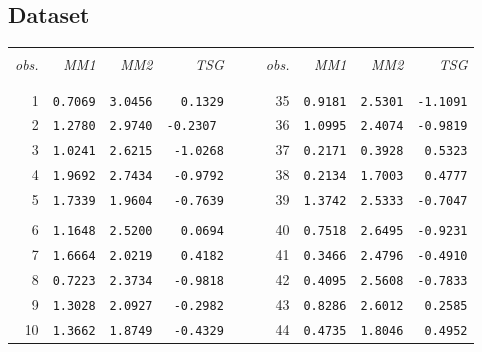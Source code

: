 \documentclass[a4paper]{article}
\theoremstyle{myexamplestyle}
\begin{document}
\subsection{Dataset}
\begin{center}
\begin{table}[!h]
\hfill{}
\begin{tabular}{rrrrrrrrrr}
\hline
\hline
\vspace{-0.1cm}
	&		&		&		&	&	&		&		&		&		\\
\vspace{-0.3cm}
\textit{obs.}	&	\textit{MM1} 	&	\textit{MM2} 	&	\textit{TSG}	 &	&	&	\textit{obs.}	&	\textit{MM1} 	&	\textit{MM2} 	&	\textit{TSG} 	\\
	&		&		&		&	&	&		&		&		&		\\
\hline
\vspace{-0.3cm}
	&		&		&		&	&	&		&		&		&		\\	
1	&	\texttt{0.7069}	&	\texttt{3.0456}	&	\texttt{0.1329}	&	&	&	35	&	\texttt{0.9181}	&	\texttt{2.5301}	&	\texttt{-1.1091} 	\\
2	&	\texttt{1.2780}	&	\texttt{2.9740}	&	\texttt{-0.2307	}&	&	&	36	&	\texttt{1.0995}	&	\texttt{2.4074}	&	\texttt{-0.9819}	
\\
3	&	\texttt{1.0241}	&	\texttt{2.6215}	&	\texttt{-1.0268} 	&	&	&	37	&	\texttt{0.2171}	&	\texttt{0.3928}	&	\texttt{0.5323}	
\\
4	&	\texttt{1.9692}	&	\texttt{2.7434}	&	\texttt{-0.9792} 	&	&	&	38	&	\texttt{0.2134}	&	\texttt{1.7003}	&	\texttt{0.4777}
\\
5	&	\texttt{1.7339}	&	\texttt{1.9604}	&	\texttt{-0.7639} 	&	&	&	39	&	\texttt{1.3742}	&	\texttt{2.5333}	&	\texttt{-0.7047}	
\\
	&		&		&		&	&	&		&		&		&		
\\
6	&	\texttt{1.1648}	&	\texttt{2.5200}	&	\texttt{0.0694}	&	&	&	40	&	\texttt{0.7518}	&	\texttt{2.6495}	&	\texttt{-0.9231}
\\
7	&	\texttt{1.6664}	&	\texttt{2.0219}	&	\texttt{0.4182}	&	&	&	41	&	\texttt{0.3466}	&	\texttt{2.4796}	&	\texttt{-0.4910}	
\\
8	&	\texttt{0.7223}	&	\texttt{2.3734}	&	\texttt{-0.9818}	 &	&	&	42	&	\texttt{0.4095}	&	\texttt{2.5608}	&	\texttt{-0.7833}
\\
9	&	\texttt{1.3028}	&	\texttt{2.0927}	&	\texttt{-0.2982}	 &	&	&	43	&	\texttt{0.8286}	&	\texttt{2.6012}	&	\texttt{0.2585}	
\\
10	&	\texttt{1.3662}	&	\texttt{1.8749}	&	\texttt{-0.4329} 	&	&	&	44	&	\texttt{0.4735}	&	\texttt{1.8046}	&	\texttt{0.4952}	

\end{tabular}
\end{table}
\end{center}
\end{document}
